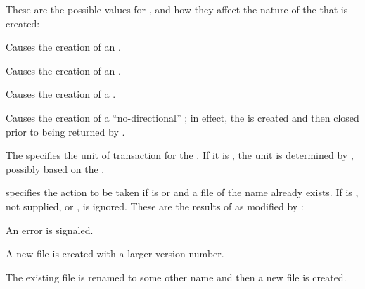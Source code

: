 \beginlist


These are the possible values for , 
and how they affect the nature of the  that is created:

\beginlist

Causes the creation of an  .


Causes the creation of an  .


Causes the creation of a  .


Causes the creation of a ``no-directional'' ; 
in effect, the  is created 
and then closed prior to being returned by .

\endlist


The  specifies the unit of transaction for the .
If it is ,
the unit is determined by ,
possibly based on the .


 specifies the action to be taken if  is
 or  and a file of the name  
already exists.
If  is , not supplied, or , 
 is ignored.
These are the results of  as modified by :

\beginlist 


An error  is signaled.


A new file is created with a larger version number.


The existing file is renamed to some other name and then a new file is created.

